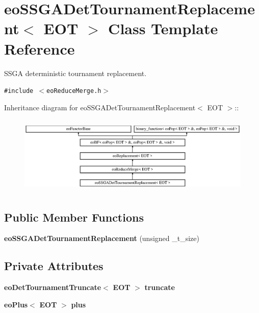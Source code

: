 \section{eo\-SSGADet\-Tournament\-Replacement$<$ EOT $>$ Class Template Reference}
\label{classeo_s_s_g_a_det_tournament_replacement}
SSGA deterministic tournament replacement.  


{\tt \#include $<$eo\-Reduce\-Merge.h$>$}

Inheritance diagram for eo\-SSGADet\-Tournament\-Replacement$<$ EOT $>$::\begin{figure}[H]
\begin{center}
\leavevmode
\includegraphics[height=3.76344cm]{classeo_s_s_g_a_det_tournament_replacement}
\end{center}
\end{figure}
\subsection*{Public Member Functions}
\begin{CompactItemize}
\item 
{\bf eo\-SSGADet\-Tournament\-Replacement} (unsigned \_\-t\_\-size)\label{classeo_s_s_g_a_det_tournament_replacement_a0}

\end{CompactItemize}
\subsection*{Private Attributes}
\begin{CompactItemize}
\item 
{\bf eo\-Det\-Tournament\-Truncate}$<$ {\bf EOT} $>$ {\bf truncate}\label{classeo_s_s_g_a_det_tournament_replacement_r0}

\item 
{\bf eo\-Plus}$<$ {\bf EOT} $>$ {\bf plus}\label{classeo_s_s_g_a_det_tournament_replacement_r1}

\end{CompactItemize}


